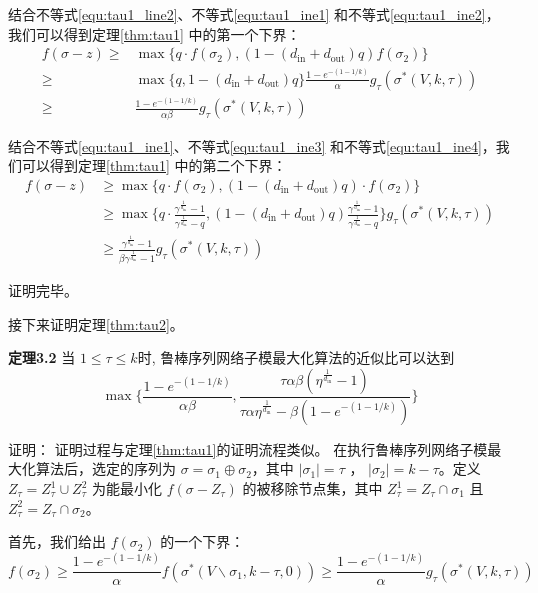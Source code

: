 结合不等式\ref{equ:tau1_line2}、不等式\ref{equ:tau1_ine1} 和不等式\ref{equ:tau1_ine2}，我们可以得到定理\ref{thm:tau1} 中的第一个下界：
\begin{align}
    f(\sigma -z ) \ge & \max\{ q \cdot f(\sigma_2),(1-(d_{\text{in}} + d_{\text{out}})q) f(\sigma_2)\} \\
    \ge & \max\{q,1-(d_{\text{in}} + d_{\text{out}})q\} \frac{1-e^{-(1-1/k)}}{\alpha} g_\tau(\sigma^*(V,k,\tau)) \\
    \ge & \frac{1-e^{-(1-1/k)}}{\alpha\beta} g_\tau(\sigma^*(V,k,\tau))
\end{align}

结合不等式\ref{equ:tau1_ine1}、不等式\ref{equ:tau1_ine3} 和不等式\ref{equ:tau1_ine4}，我们可以得到定理\ref{thm:tau1} 中的第二个下界：
\begin{align}
     f(\sigma -z ) & \ge \max\{ q \cdot f(\sigma_2),(1-(d_{\text{in}} + d_{\text{out}})q) \cdot f(\sigma_2)\} \\
    & \ge \max\{ q \cdot \frac{\gamma^{\frac{1}{d_{\text{in}}}}-1}{\gamma^{\frac{1}{d_{\text{in}}}}-q} , (1-(d_{\text{in}} + d_{\text{out}})q) \frac{\gamma^{\frac{1}{d_{\text{in}}}}-1}{\gamma^{\frac{1}{d_{\text{in}}}}-q} \} g_\tau(\sigma^*(V,k,\tau)) \\
    & \ge \frac{\gamma^{\frac{1}{d_{\text{in}}}}-1}{\beta \gamma^{\frac{1}{d_{\text{in}}}}-1} g_\tau(\sigma^*(V,k,\tau))
\end{align}

\noindent 证明完毕。


接下来证明定理\ref{thm:tau2}。

\noindent \textbf{定理3.2} 当 $1\le \tau \le k$时, 鲁棒序列网络子模最大化算法的近似比可以达到
\begin{equation*}
 \max\{\frac{1-e^{-(1-1/k)}}{\alpha\beta},\frac{\tau\alpha\beta(\eta^{\frac{1}{d_{\text{in}}}}-1)}{\tau\alpha\eta^{\frac{1}{d_{\text{in}}}}- \beta (1-e^{-(1-1/k)}) }\}   
\end{equation*}

\noindent 证明：
证明过程与定理\ref{thm:tau1}的证明流程类似。
在执行鲁棒序列网络子模最大化算法后，选定的序列为 $\sigma=\sigma_1 \oplus \sigma_2$，其中 $|\sigma_1|=\tau$ ， $|\sigma_2|=k-\tau$。定义 $Z_{\tau} = Z_{\tau}^1 \cup Z_{\tau}^2$ 为能最小化 $f(\sigma-Z_{\tau})$ 的被移除节点集，其中 $Z_{\tau}^1 = Z_{\tau} \cap \sigma_1$ 且 $Z_{\tau}^2 = Z_{\tau} \cap \sigma_2$。

首先，我们给出 $f(\sigma_2)$ 的一个下界：
\begin{equation}
    f(\sigma_2) \ge \frac{1-e^{-(1-1/k)}}{\alpha} f(\sigma^*(V\backslash \sigma_1,k-\tau,0)) \ge \frac{1-e^{-(1-1/k)}}{\alpha} g_\tau(\sigma^*(V,k,\tau)) \label{equ:tau2_line1}
\end{equation}

